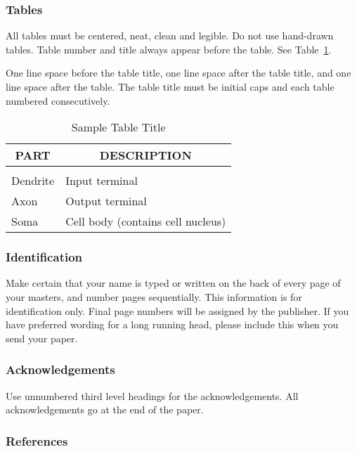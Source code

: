 \subsubsection{Tables}

All tables must be centered, neat, clean and legible. Do not use
hand-drawn tables. Table number and title always appear before the
table.
See Table~\ref{sample-table}.

One line space before the table title, one line space after the
table title, and one line space after the table. The table title
must be initial caps and each table numbered consecutively.

\begin{table}[t]
\caption{Sample Table Title}
\label{sample-table}
\begin{center}
\begin{tabular}{ll}
\multicolumn{1}{c}{\bf PART}  &\multicolumn{1}{c}{\bf DESCRIPTION}
\\ \hline \\
Dendrite         &Input terminal \\
Axon             &Output terminal \\
Soma             &Cell body (contains cell nucleus) \\
\end{tabular}
\end{center}
\end{table}

\subsubsection{Identification} 

Make certain that your name is typed or written on the back of
every page of your masters, and number pages sequentially. This
information is for identification only. Final page numbers will be
assigned by the publisher. If you have preferred wording for a long
running head, please include this when you send your paper. 

\subsubsection*{Acknowledgements}

Use unnumbered third level headings for the acknowledgements.  All
acknowledgements go at the end of the paper.


\subsubsection*{References}

